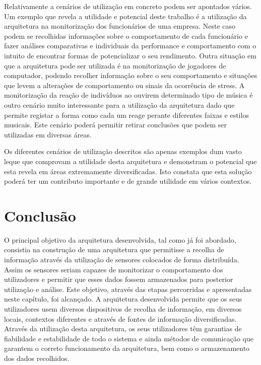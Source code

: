 Relativamente a cenários de utilização em concreto podem ser apontados vários. Um exemplo que revela a utilidade e potencial deste trabalho é a utilização da arquitetura na monitorização dos funcionários de uma empresa. Neste caso podem se recolhidas informações sobre o comportamento de cada funcionário e fazer análises comparativas e individuais da performance e comportamento com o intuito de encontrar formas de potencializar o seu rendimento. Outra situação em que a arquitetura pode ser utilizada é na monitorização de jogadores de computador, podendo recolher informação sobre o seu comportamento e situações que levem a alterações de comportamento ou sinais da ocorrência de stress. A monitorização da reação de indivíduos ao ouvirem determinado tipo de música é outro cenário muito interessante para a utilização da arquitetura dado que permite registar a forma como cada um reage perante diferentes faixas e estilos musicais. Este cenário poderá permitir retirar conclusões que podem ser utilizadas em diversas áreas.

Os diferentes cenários de utilização descritos são apenas exemplos dum vasto leque que comprovam a utilidade desta arquitetura e demonstram o potencial que esta revela em áreas extremamente diversificadas. Isto constata que esta solução poderá ter um contributo importante e de grande utilidade em vários contextos.

\section{Conclusão}

O principal objetivo da arquitetura desenvolvida, tal como já foi abordado, consistia na construção de uma arquitetura que permitisse a recolha de informação através da utilização de sensores colocados de forma distribuída. Assim os sensores seriam capazes de monitorizar o comportamento dos utilizadores e permitir que esses dados fossem armazenados para posterior utilização e análise. Este objetivo, através das etapas percorridas e apresentadas neste capítulo, foi alcançado. A arquitetura desenvolvida permite que os seus utilizadores usem diversos dispositivos de recolha de informação, em diversos locais, contextos diferentes e através de fontes de informação diversificadas. Através da utilização desta arquitetura, os seus utilizadores têm garantias de fiabilidade e estabilidade de todo o sistema e ainda métodos de comunicação que garantem o correto funcionamento da arquitetura, bem como o armazenamento dos dados recolhidos.

